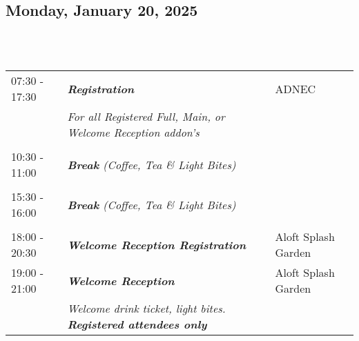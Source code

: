 \subsection{Monday, January 20, 2025}
\\
\\
\begin{longtable}{p{15mm}p{60mm}p{30mm}}
{07:30 - 17:30} & \emph{\textbf{Registration}} & ADNEC \\
& \emph{For all Registered Full, Main, or Welcome Reception addon’s} & \\\\
{10:30 - 11:00} & \emph{\textbf{Break} (Coffee, Tea \& Light Bites)} & \\\\
{15:30 - 16:00} & \emph{\textbf{Break} (Coffee, Tea \& Light Bites)} & \\\\
{18:00 - 20:30} & \emph{\textbf{Welcome Reception Registration}} & Aloft Splash Garden \\
{19:00 - 21:00} & \emph{\textbf{Welcome Reception}} & Aloft Splash Garden \\
& \emph{Welcome drink ticket, light bites. \textbf{Registered attendees only}} &
\end{longtable}

